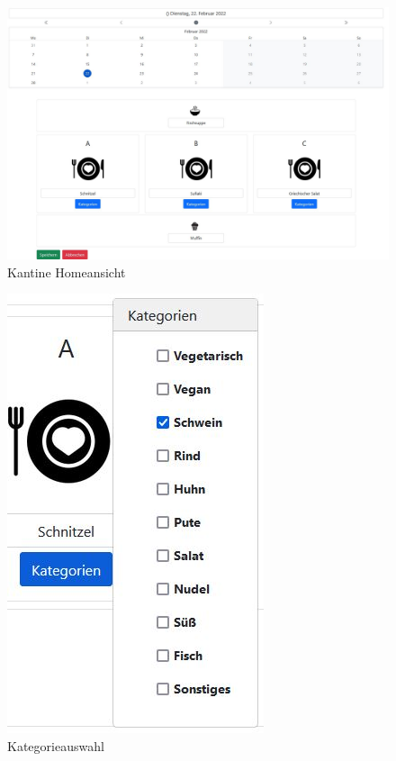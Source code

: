 \begin{figure}[htp]
    \centering
    \includegraphics[scale=0.35]{pics/kantine_home.JPG}
    \caption{Kantine Homeansicht}
    \label{fig:impl:CantineHome}
\end{figure}

\begin{figure}[htp]
    \centering
    \includegraphics[scale=0.4]{pics/kategorien_kantine.JPG}
    \caption{Kategorieauswahl}
    \label{fig:impl:CategoryChooseCantine}
\end{figure}
\pagebreak

